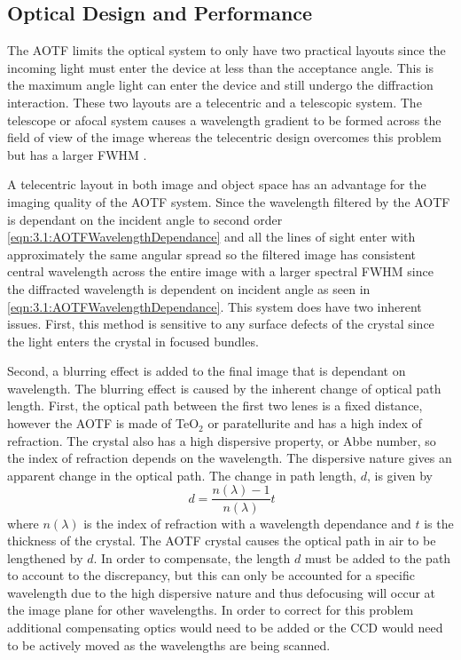 \documentclass[12pt]{article}
\begin{document}
\subsection{Optical Design and Performance}

The AOTF limits the optical system to only have two practical layouts since the incoming light must enter the device at less than the acceptance angle. This is the maximum angle light can enter the device and still undergo the diffraction interaction. These two layouts are a telecentric and a telescopic system. The telescope or afocal system causes a wavelength gradient to be formed across the field of view of the image whereas the telecentric design overcomes this problem but has a larger FWHM \citep{Suhre2004}.

A telecentric layout in both image and object space has an advantage for the imaging quality of the AOTF system. Since the wavelength filtered by the AOTF is dependant on the incident angle to second order \autoref{eqn:3.1:AOTFWavelengthDependance} and all the lines of sight enter with approximately the same angular spread so the filtered image has consistent central wavelength across the entire image with a larger spectral FWHM since the diffracted wavelength is dependent on incident angle as seen in \autoref{eqn:3.1:AOTFWavelengthDependance}. This system does have two inherent issues. First, this method is sensitive to any surface defects of the crystal since the light enters the crystal in focused bundles.

Second, a blurring effect is added to the final image that is dependant on wavelength. The blurring effect is caused by the inherent change of optical path length. First, the optical path between the first two lenes is a fixed distance, however the AOTF is made of TeO$_{2}$ or paratellurite and has a high index of refraction. The crystal also has a high dispersive property, or Abbe number, so the index of refraction depends on the wavelength. The dispersive nature gives an apparent change in the optical path. The change in path length, $d$, is given by
\begin{equation}
    \ d = \frac{n(\lambda)-1}{n(\lambda)}t
    \label{eqn:3.2:opticalPathDisplacement}
\end{equation}
where $n(\lambda)$ is the index of refraction with a wavelength dependance and $t$ is the thickness of the crystal. The AOTF crystal causes the optical path in air to be lengthened by $d$. In order to compensate, the length $d$ must be added to the path to account to the discrepancy, but this can only be accounted for a specific wavelength due to the high dispersive nature and thus defocusing will occur at the image plane for other wavelengths. In order to correct for this problem additional compensating optics would need to be added or the CCD would need to be actively moved as the wavelengths are being scanned.
\end{document}
